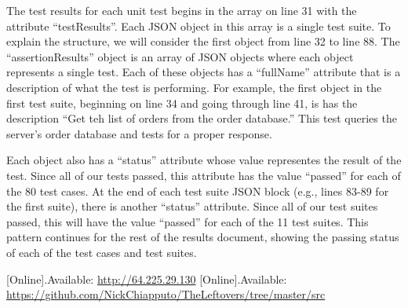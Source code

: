 \documentclass[11pt]{article}
\begin{document}
		The test results for each unit test begins in the array on line 31 with the attribute ``testResults''. Each JSON object in this array is a single test suite. To explain the structure, we will consider the first object from line 32 to line 88. The ``assertionResults'' object is an array of JSON objects where each object represents a single test. Each of these objects has a ``fullName'' attribute that is a description of what the test is performing. For example, the first object in the first test suite, beginning on line 34 and going through line 41, is has the description ``Get teh list of orders from the order database.'' This test queries the server's order database and tests for a proper response. 

		Each object also has a ``status'' attribute whose value representes the result of the test. Since all of our tests passed, this attribute has the value ``passed'' for each of the 80 test cases. At the end of each test suite JSON block (e.g., lines 83-89 for the first suite), there is another ``status'' attribute. Since all of our test suites passed, this will have the value ``passed'' for each of the 11 test suites. This pattern continues for the rest of the results document, showing the passing status of each of the test cases and test suites.

	\begin{thebibliography}{00}
		 [Online].Available: \url{http://64.225.29.130}
		 [Online].Available: \url{https://github.com/NickChiapputo/TheLeftovers/tree/master/src}
	\end{thebibliography}
\end{document}
